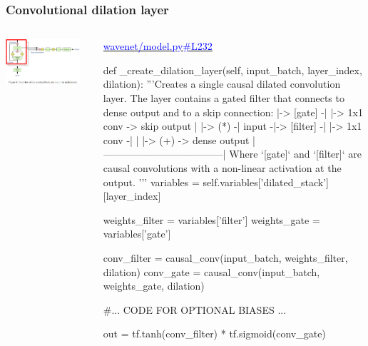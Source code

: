 \documentclass[8pt]{beamer}
\begin{document}
\begin{frame}[fragile]
\frametitle{Convolutional dilation layer}
\begin{columns}
\begin{column}{0.5\textwidth}
 
\includegraphics[width=0.9\textwidth]{./dl3_images/dilation_layer.png}

\end{column}
\begin{column}{0.5\textwidth}
 \href{https://github.com/ibab/tensorflow-wavenet/blob/master/wavenet/model.py\#L232}{\textcolor{blue}{wavenet/model.py\#L232}}
 
 \begin{verbnobox}[\tiny]
def _create_dilation_layer(self, input_batch, layer_index, dilation):
        '''Creates a single causal dilated convolution layer.
        The layer contains a gated filter that connects to dense output
        and to a skip connection:
               |-> [gate]   -|        |-> 1x1 conv -> skip output
               |             |-> (*) -|
        input -|-> [filter] -|        |-> 1x1 conv -|
               |                                    |-> (+) -> dense output
               |------------------------------------|
        Where `[gate]` and `[filter]` are causal convolutions with a
        non-linear activation at the output.
        '''
        variables = self.variables['dilated_stack'][layer_index]

        weights_filter = variables['filter']
        weights_gate = variables['gate']

        conv_filter = causal_conv(input_batch, weights_filter, dilation)
        conv_gate = causal_conv(input_batch, weights_gate, dilation)

            #... CODE FOR OPTIONAL BIASES ...

        out = tf.tanh(conv_filter) * tf.sigmoid(conv_gate)


\end{verbnobox}
\end{column}
\end{columns}
\end{frame}
\end{document}
